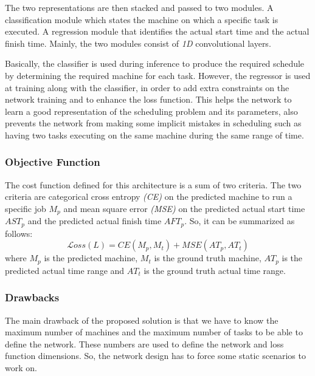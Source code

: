 The two representations are then stacked and passed to two modules. A classification module which states the machine on which a specific task is executed. A regression module that identifies the actual start time and the actual finish time. Mainly, the two modules consist of \emph{1D} convolutional layers. 

Basically, the classifier is used during inference to produce the required schedule by determining the required machine for each task. However, the regressor is used at training along with the classifier, in order to add extra constraints on the network training and to enhance the loss function. This helps the network to learn a good representation of the scheduling problem and its parameters, also prevents the network from making some implicit mistakes in scheduling such as having two tasks executing on the same machine during the same range of time. \\
    
\subsubsection{Objective Function}
The cost function defined for this architecture is a sum of two criteria. The two criteria are categorical cross entropy \emph{(CE)} on the predicted machine to run a specific job $M_p$ and mean square error \emph{(MSE)} on the predicted actual start time $AST_p$ and the predicted actual finish time $AFT_p$. So, it can be summarized as follows:
\begin{equation}
\mathcal Loss(L) = CE(M_p, M_t) + MSE(AT_p, AT_t) \label{eq:l}
\end{equation}
where $M_p$ is the predicted machine, $M_t$ is the ground truth machine, $AT_p$ is the predicted actual time range and $AT_t$ is the ground truth actual time range. \\

\subsubsection{Drawbacks}
The main drawback of the proposed solution is that we have to know the maximum number of machines and the maximum number of tasks to be able to define the network. These numbers are used to define the network and loss function dimensions. So, the network design has to force some static scenarios to work on.